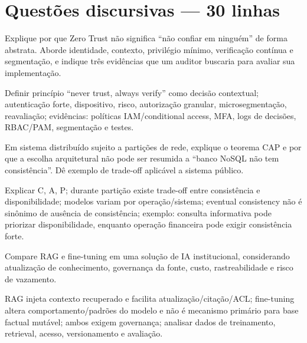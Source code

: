 \section{Questões discursivas — 30 linhas}

\begin{discursiva}
Explique por que Zero Trust não significa ``não confiar em ninguém'' de forma abstrata. Aborde identidade, contexto, privilégio mínimo, verificação contínua e segmentação, e indique três evidências que um auditor buscaria para avaliar sua implementação.
\end{discursiva}
\begin{resumo}[espelho Q1]Definir princípio ``never trust, always verify'' como decisão contextual; autenticação forte, dispositivo, risco, autorização granular, microsegmentação, reavaliação; evidências: políticas IAM/conditional access, MFA, logs de decisões, RBAC/PAM, segmentação e testes.\end{resumo}

\begin{discursiva}
Em sistema distribuído sujeito a partições de rede, explique o teorema CAP e por que a escolha arquitetural não pode ser resumida a ``banco NoSQL não tem consistência''. Dê exemplo de trade-off aplicável a sistema público.
\end{discursiva}
\begin{resumo}[espelho Q2]Explicar C, A, P; durante partição existe trade-off entre consistência e disponibilidade; modelos variam por operação/sistema; eventual consistency não é sinônimo de ausência de consistência; exemplo: consulta informativa pode priorizar disponibilidade, enquanto operação financeira pode exigir consistência forte.\end{resumo}

\begin{discursiva}
Compare RAG e fine-tuning em uma solução de IA institucional, considerando atualização de conhecimento, governança da fonte, custo, rastreabilidade e risco de vazamento.
\end{discursiva}
\begin{resumo}[espelho Q3]RAG injeta contexto recuperado e facilita atualização/citação/ACL; fine-tuning altera comportamento/padrões do modelo e não é mecanismo primário para base factual mutável; ambos exigem governança; analisar dados de treinamento, retrieval, acesso, versionamento e avaliação.\end{resumo}

